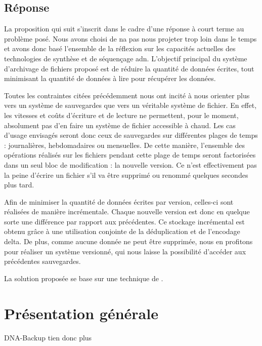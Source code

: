 \documentclass[a4paper]{report}
\begin{document}
\section{Réponse}

La proposition qui suit s'inscrit dans le cadre d'une réponse à court terme au problème posé.
Nous avons choisi de na pas nous projeter trop loin dans le temps et avons donc basé l'ensemble de la réflexion sur les capacités actuelles des technologies de synthèse et de séquençage \ac{adn}.
L'objectif principal du système d'archivage de fichiers proposé est de réduire la quantité de données écrites, tout minimisant la quantité de données à lire pour récupérer les données.

Toutes les contraintes citées précédemment nous ont incité %
à nous orienter plus vers un système de sauvegardes que vers un véritable système de fichier.
En effet, les vitesses et coûts d'écriture et de lecture ne permettent, pour le moment, absolument pas d'en faire un système de fichier accessible à chaud.
Les cas d'usage envisagés seront donc ceux de sauvegardes sur différentes plages de temps : journalières, hebdomadaires ou mensuelles.
De cette manière, l'ensemble des opérations réalisés sur les fichiers pendant cette plage de temps seront factorisées dans un seul bloc de modification : la nouvelle version.
Ce n'est effectivement pas la peine d'écrire un fichier s'il va être supprimé ou renommé quelques secondes plus tard.

Afin de minimiser la quantité de données écrites par version, celles-ci sont réalisées de manière incrémentale.
Chaque nouvelle version est donc en quelque sorte une différence par rapport aux précédentes.
Ce stockage incrémental est obtenu grâce à une utilisation conjointe de la déduplication et de l'encodage delta.
De plus, comme aucune donnée ne peut être supprimée, nous en profitons pour réaliser un système versionné, qui nous laisse la possibilité d'accéder aux précédentes sauvegardes.




La solution proposée se base sur une technique de  \cite{shilane2012wan}.

\chapter{Présentation générale}

DNA-Backup tien donc plus 
\end{document}
